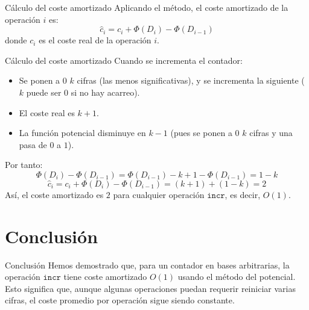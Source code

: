 \documentclass[aspectratio=169]{beamer}
\begin{document}
\begin{frame}{Cálculo del coste amortizado}
    Aplicando el método, el coste amortizado de la operación $i$ es:
    \[
    \hat{c}_i = c_i + \Phi(D_i) - \Phi(D_{i-1})
    \]
    donde $c_i$ es el coste real de la operación $i$.
\end{frame}

\begin{frame}{Cálculo del coste amortizado}
    Cuando se incrementa el contador:
    \begin{itemize}
        \item Se ponen a $0$ $k$ cifras (las menos significativas), y se incrementa la siguiente ($k$ puede ser $0$ si no hay acarreo).
        \item El coste real es $k+1$.
        \item La función potencial disminuye en $k-1$ (pues se ponen a $0$ $k$ cifras y una pasa de $0$ a $1$).
    \end{itemize}
    Por tanto:
    \[
    \Phi(D_i) - \Phi(D_{i-1}) = \Phi(D_{i-1}) - k + 1 - \Phi(D_{i-1}) = 1 - k
    \]
    \[
    \hat{c}_i = c_i + \Phi(D_i) - \Phi(D_{i-1}) = (k+1) + (1-k) = 2
    \]
    Así, el coste amortizado es $2$ para cualquier operación $\texttt{incr}$, es decir, $O(1)$.
\end{frame}


\section{Conclusión}
\begin{frame}{Conclusión}
    Hemos demostrado que, para un contador en bases arbitrarias, la operación $\texttt{incr}$ tiene coste amortizado $O(1)$ usando el método del potencial. Esto significa que, aunque algunas operaciones puedan requerir reiniciar varias cifras, el coste promedio por operación sigue siendo constante.
\end{frame}
\end{document}
